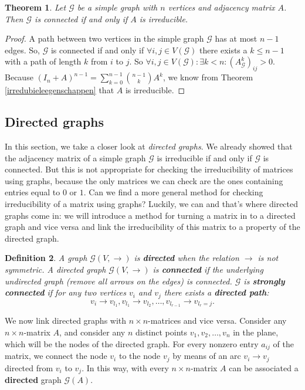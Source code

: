 \documentclass[a4paper,11pt]{report}
\newtheorem{theorem}{Theorem}[section]
\newtheorem{definition}[theorem]{Definition}
\newcommand{\graf}{\mathscr{G}}
\begin{document}
 \begin{theorem}
   Let $\graf$ be a simple graph with $n$ vertices and adjacency matrix $A$. 
   Then $\graf$ is connected if and only if $A$ is irreducible.
 \end{theorem}
 
 \begin{proof}
   A path between two vertices in the simple graph $\graf$ has at most $n-1$ 
   edges. So, $\graf$ is connected if and only if $\forall i, j \in V(\graf)$ there exists 
   a $k \leq n- 1$ with a path of length $k$ from $i$ to $j$. So $\forall i, j \in V(\graf): \exists k < n: (A^k_\graf)_{ij} > 
   0$. Because $(I_n + A)^{n-1} = \sum^{n-1}_{k=0}{n-1 \choose k}A^k$, we know from Theorem \ref{irredubieleegenschappen} that
$A$ is irreducible.   
 \end{proof}
\subsection{Directed graphs}
In this section, we take a closer look at \emph{directed graphs}. We already 
showed that the adjacency matrix of a simple graph $\graf$ is irreducible if and only 
if $\graf$ is connected. But this is not appropriate for checking the irreducibility 
of matrices using graphs, because the only matrices we can check
are the ones containing entries equal to $0$ or $1$. Can we find a more general method for checking irreducibility of 
a matrix using graphs? Luckily, we can and that's where directed graphs come 
in: we will introduce a method for turning a matrix in to a directed graph 
and vice versa and link the irreducibility of this matrix to a property of the 
directed graph.
\begin{definition}
  A graph $\graf(V,\to)$ is \textbf{directed} when the relation $\to$ is not symmetric.
    A directed graph $\graf(V, \to)$ is \textbf{connected} if the underlying undirected graph
  (remove all arrows on the edges) is connected. $\graf$ is \textbf{strongly connected} if for any two
  vertices $v_i$ and $v_j$ there exists a \textbf{directed path}:
  $$v_i \rightarrow v_{l_1}, v_{l_1} \rightarrow v_{l_2}, \ldots, v_{l_{r-1}} 
  \rightarrow v_{l_r = j}.$$

 \end{definition}

We now link directed graphs with $n \times n$-matrices and vice versa. Consider any $n \times n$-matrix $A$, and consider any $n$ distinct 
points $v_1, v_2,\ldots,v_n$ in the plane, which will be the nodes of the directed graph. 
For every nonzero entry $a_{ij}$ of the matrix, we connect the node $v_i$ to the 
node $v_j$ by means of an arc $v_i \rightarrow v_j$ directed from $v_i$ to 
$v_j$. In this way, with every $n \times n$-matrix $A$ can be associated a \textbf{directed} 
graph $\graf(A)$.
\end{document}
